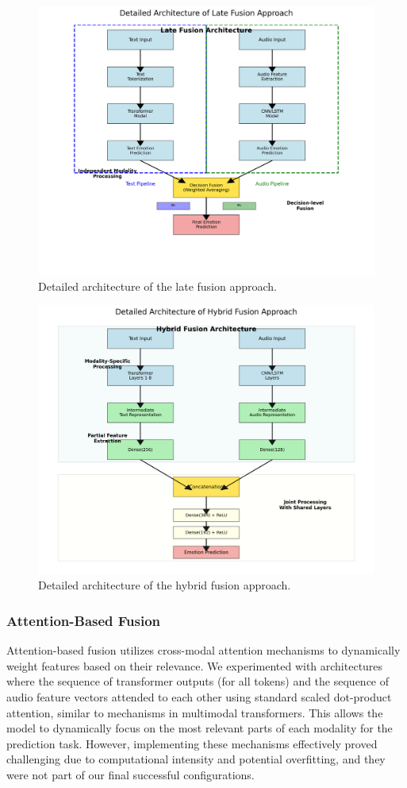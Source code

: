 \documentclass[12pt]{article}
\begin{document}
\begin{figure}[h]
    \centering
    \includegraphics[width=0.9\linewidth]{Figures/late_fusion_detailed_proper.png}
    \caption{Detailed architecture of the late fusion approach.}
    \label{fig:late_fusion}
\end{figure}

\begin{figure}[h]
    \centering
    \includegraphics[width=0.9\linewidth]{Figures/hybrid_fusion_detailed.png}
    \caption{Detailed architecture of the hybrid fusion approach.}
    \label{fig:hybrid_fusion}
\end{figure}

\subsubsection{Attention-Based Fusion}
Attention-based fusion utilizes cross-modal attention mechanisms to dynamically weight features based on their relevance. We experimented with architectures where the sequence of transformer outputs (for all tokens) and the sequence of audio feature vectors attended to each other using standard scaled dot-product attention, similar to mechanisms in multimodal transformers. This allows the model to dynamically focus on the most relevant parts of each modality for the prediction task. However, implementing these mechanisms effectively proved challenging due to computational intensity and potential overfitting, and they were not part of our final successful configurations.
\end{document}
